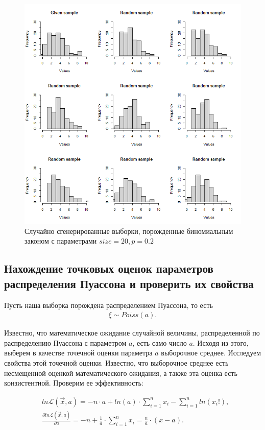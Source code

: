 \documentclass[14pt,a4paper]{scrartcl}
\theoremstyle{definition}
\theoremstyle{remark}
\theoremstyle{definition}
\theoremstyle{definition}
\begin{document}
\begin{figure}[H]
  \includegraphics[width=\linewidth]{RPlotBinom.png}
  \caption{Случайно сгенерированные выборки, порожденные биномиальным законом с параметрами $size = 20, p = 0.2$}
  \label{fig:image3}
\end{figure}

\subsection{Нахождение точковых оценок параметров распределения Пуассона и проверить их свойства}

Пусть наша выборка порождена распределением Пуассона, то есть
\begin{align*}
  \xi \sim Poiss(a).
\end{align*}

Известно, что математическое ожидание случайной величины, распределенной по распределению Пуассона с параметром $a$, есть само число $a$. Исходя из этого, выберем в качестве точечной оценки параметра $a$ выборочное среднее.
Исследуем свойства этой точечной оценки. Известно, что выборочное среднее есть несмещенной оценкой математического ожидания, а также эта оценка есть конзистентной. Проверим ее эффективность:

\begin{align*}
  &ln \mathcal{L}(\vec{x}, a) = -n\cdot a + ln(a)\cdot \sum_{i = 1}^{n} x_i - \sum_{i = 1}^{n} ln(x_i!), \\
  &\frac{\partial ln \mathcal{L}(\vec{x}, a)}{\partial a} = -n + \frac{1}{a}\cdot \sum_{i = 1}^{n} x_i = \frac{n}{a}\cdot (\overline{x} - a).
\end{align*}
\end{document}
